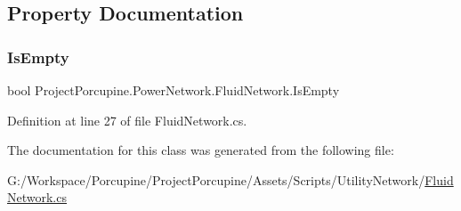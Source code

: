 \subsection{Property Documentation}
\mbox{\label{class_project_porcupine_1_1_power_network_1_1_fluid_network_a43316477decc4a1215cbc08f32a6da3d}} 
\subsubsection{\texorpdfstring{Is\+Empty}{IsEmpty}}
{\footnotesize\ttfamily bool Project\+Porcupine.\+Power\+Network.\+Fluid\+Network.\+Is\+Empty\hspace{0.3cm}{\ttfamily [get]}}



Definition at line 27 of file Fluid\+Network.\+cs.



The documentation for this class was generated from the following file\+:\begin{DoxyCompactItemize}
\item 
G\+:/\+Workspace/\+Porcupine/\+Project\+Porcupine/\+Assets/\+Scripts/\+Utility\+Network/\hyperlink{_fluid_network_8cs}{Fluid\+Network.\+cs}\end{DoxyCompactItemize}
